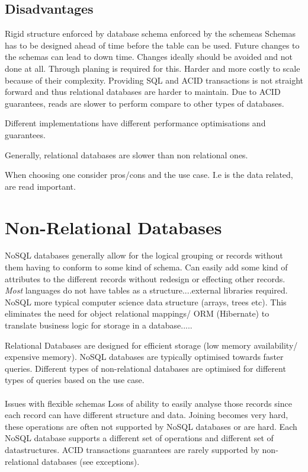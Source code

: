 \documentclass[a4paper, 11pt]{book}
\begin{document}
    \subsection{Disadvantages}
    Rigid structure enforced by database schema enforced by the schemeas
    Schemas has to be designed ahead of time before the table can be used.
    Future changes to the schemas can lead to down time.
    Changes ideally should be avoided and not done at all.
    Through planing is required for this.
    Harder and more costly to scale because of their complexity.
    Providing SQL and ACID transactions is not straight forward and thus relational databases are harder to maintain.
    Due to ACID guarantees, reads are slower to perform compare to other types of databases.

    Different implementations have different performance optimisations and guarantees.

    Generally, relational databases are slower than non relational ones.

    When choosing one consider pros/cons and the use case.
    I.e is the data related, are read important.


    \section{Non-Relational Databases}
    NoSQL databases generally allow for the logical grouping or records without them having to conform to some kind of schema.
    Can easily add some kind of attributes to the different records without redesign or effecting other records.
    \textit{Most} languages do not have tables as a structure....external libraries required.
    NoSQL more typical computer science data structure (arrays, trees etc).
    This eliminates the need for object relational mappings/ ORM (Hibernate) to translate business logic for storage in a database.....

    Relational Databases are designed for efficient storage (low memory availability/ expensive memory).
    NoSQL databases are typically optimised towards faster queries.
    Different types of non-relational databases are optimised for different types of queries based on the use case.

    \paragraph{}
    Issues with flexible schemas
    Loss of ability to easily analyse those records since each record can have different structure and data.
    Joining becomes very hard, these operations are often not supported by NoSQL databases or are hard.
    Each NoSQL database supports a different set of operations and different set of datastructures.
    ACID transactions guarantees are rarely supported by non-relational databases (see exceptions).
\end{document}
